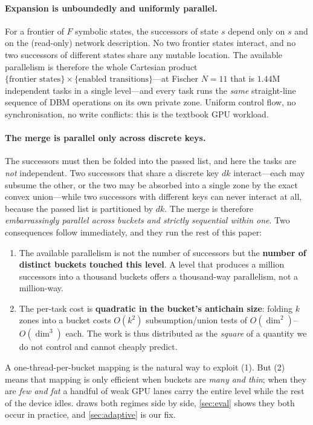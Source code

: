 \documentclass[11pt]{article}
\newcommand{\dk}{\ensuremath{\mathit{dk}}}
\begin{document}
\paragraph{Expansion is unboundedly and uniformly parallel.} For a frontier of $F$ symbolic states,
the successors of state $s$ depend only on $s$ and on the (read-only) network description. No two
frontier states interact, and no two successors of different states share any mutable location. The
available parallelism is therefore the whole Cartesian product
$\{\text{frontier states}\} \times \{\text{enabled transitions}\}$---at Fischer $N{=}11$ that is
$1.44$M independent tasks in a single level---and every task runs the \emph{same} straight-line
sequence of DBM operations on its own private zone. Uniform control flow, no synchronisation, no
write conflicts: this is the textbook GPU workload.

\paragraph{The merge is parallel only across discrete keys.} The successors must then be folded into
the passed list, and here the tasks are \emph{not} independent. Two successors that share a discrete
key $\dk$ interact---each may subsume the other, or the two may be absorbed into a single zone by the
exact convex union---while two successors with different keys can never interact at all, because the
passed list is partitioned by $\dk$. The merge is therefore \emph{embarrassingly parallel across
buckets and strictly sequential within one}. Two consequences follow immediately, and they run the
rest of this paper:
\begin{enumerate}\itemsep2pt
  \item The available parallelism is not the number of successors but the \textbf{number of distinct
        buckets touched this level}. A level that produces a million successors into a thousand
        buckets offers a thousand-way parallelism, not a million-way.
  \item The per-task cost is \textbf{quadratic in the bucket's antichain size}: folding $k$ zones
        into a bucket costs $O(k^2)$ subsumption/union tests of $O(\dim^2)$--$O(\dim^3)$ each. The
        work is thus distributed as the \emph{square} of a quantity we do not control and cannot
        cheaply predict.
\end{enumerate}
A one-thread-per-bucket mapping is the natural way to exploit (1). But (2) means that mapping is only
efficient when buckets are \emph{many and thin}; when they are \emph{few and fat} a handful of weak
GPU lanes carry the entire level while the rest of the device idles.  draws both
regimes side by side, \cref{sec:eval} shows they both occur in practice, and \cref{sec:adaptive} is
our fix.
\end{document}
